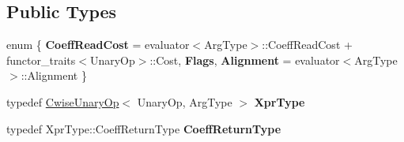 \subsection*{Public Types}
\begin{DoxyCompactItemize}
\item 
\mbox{\label{struct_eigen_1_1internal_1_1unary__evaluator_3_01_cwise_unary_op_3_01_unary_op_00_01_arg_type_01_4_00_01_index_based_01_4_aa9279dc12a1df1f807e5abfcdc7e1170}} 
enum \{ {\bfseries Coeff\+Read\+Cost} = evaluator$<$Arg\+Type$>$\+::Coeff\+Read\+Cost + functor\+\_\+traits$<$Unary\+Op$>$\+::Cost, 
{\bfseries Flags}, 
{\bfseries Alignment} = evaluator$<$Arg\+Type$>$\+::Alignment
 \}
\item 
\mbox{\label{struct_eigen_1_1internal_1_1unary__evaluator_3_01_cwise_unary_op_3_01_unary_op_00_01_arg_type_01_4_00_01_index_based_01_4_a386a99429497b18b27b408cd1bc8990d}} 
typedef \mbox{\hyperlink{class_eigen_1_1_cwise_unary_op}{Cwise\+Unary\+Op}}$<$ Unary\+Op, Arg\+Type $>$ {\bfseries Xpr\+Type}
\item 
\mbox{\label{struct_eigen_1_1internal_1_1unary__evaluator_3_01_cwise_unary_op_3_01_unary_op_00_01_arg_type_01_4_00_01_index_based_01_4_a739e82ab90bfd36c853fca4227a756d0}} 
typedef Xpr\+Type\+::\+Coeff\+Return\+Type {\bfseries Coeff\+Return\+Type}
\end{DoxyCompactItemize}
